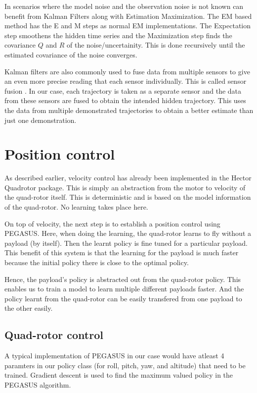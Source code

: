 \documentclass[hidelinks,BTech]{iitmdiss}
\begin{document}
In scenarios where the model noise and the observation noise is not known can benefit from Kalman Filters along with Estimation Maximization. The EM based method has the E and M steps as normal EM implementations. The Expectation step smoothens the hidden time series and the Maximization step finds the covariance $Q$ and $R$ of the noise/uncertainity. This is done recursively until the estimated covariance of the noise converges.

Kalman filters are also commonly used to fuse data from multiple sensors to give an even more precise reading that each sensor individually. This is called sensor fusion \cite{KalmanFiltersFusion}. In our case, each trajectory is taken as a separate sensor and the data from these sensors are fused to obtain the intended hidden trajectory. This uses the data from multiple demonstrated trajectories  to obtain a better estimate than just one demonstration.

\chapter{Position control}

As described earlier, velocity control has already been implemented in the Hector Quadrotor package. This is simply an abstraction from the motor to velocity of the quad-rotor itself. This is deterministic and is based on the model information of the quad-rotor. No learning takes place here.

On top of velocity, the next step is to establish a position control using PEGASUS. Here, when doing the learning, the quad-rotor learns to fly without a payload (by itself). Then the learnt policy is fine tuned for a particular payload. This benefit of this system is that the learning for the payload is much faster because the initial policy there is close to the optimal policy.

Hence, the payload's policy is abstracted out from the quad-rotor policy. This enables us to train a model to learn multiple different payloads faster. And the policy learnt from the quad-rotor can be easily transfered from one payload to the other easily.

\section{Quad-rotor control}

A typical implementation of PEGASUS in our case would have atleast 4 paramters in our policy class (for roll, pitch, yaw, and altitude) that need to be trained. Gradient descent is used to find the maximum valued policy in the PEGASUS algorithm.
\end{document}
